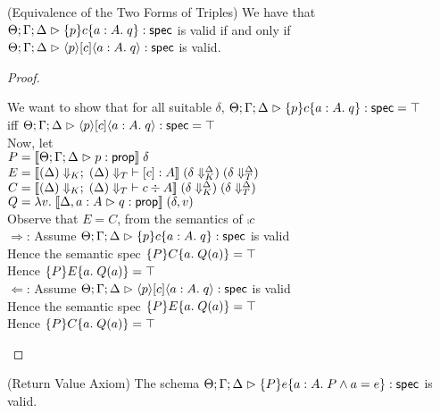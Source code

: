 \begin{lemma}{(Equivalence of the Two Forms of Triples)}
We have that $\judgeS{\spec{p}{c}{a:A}{q}}$ is valid if and only if $\judgeS{\mspec{p}{\comp{c}}{a:A}{q}}$ is valid.
\end{lemma}

\begin{proof}
\begin{tabbedproof}
\oo We want to show that for all suitable $\delta$, $\judgeS{\spec{p}{c}{a:A}{q}} = \top$  \\
\ox iff $\judgeS{\mspec{p}{\comp{c}}{a:A}{q}} = \top$  \\
\oo Now, let \\
\oox $P = \interp{\judgeA{p}{\assert}}\;\delta$ \\
\oox $E = \interp{\judgeE[\restrictkind{\Delta}]{\restricttype{\Delta}}
                  {[c]}{A}} \;(\restricttyenv{\Delta}{\delta})
                            \;(\restrictvals{\Delta}{\delta})$ \\
\oox $C = \interp{\judgeC[\restrictkind{\Delta}]{\restricttype{\Delta}}
                  {c}{A}} \;(\restricttyenv{\Delta}{\delta})
                          \;(\restrictvals{\Delta}{\delta})$ \\
\oox $Q = \semfun{v}{\interp{\judgeA[\Delta, a:A]{q}{\assert}}\;(\delta,v)}$ \\
\oo Observe that $E = C$, from the semantics of $\comp{c}$ \\
\oo $\Rightarrow$: Assume $\judgeS{\spec{p}{c}{a:A}{q}}$ is valid \\
\ooo Hence the semantic spec $\spec{P}{C}{a}{Q(a)} = \top$ \\
\ooo Hence $\spec{P}{E}{a}{Q(a)} = \top$ \\
\oo $\Leftarrow$: Assume $\judgeS{\mspec{p}{\comp{c}}{a:A}{q}}$ is valid \\
\ooo Hence the semantic spec $\spec{P}{E}{a}{Q(a)} = \top$ \\
\ooo Hence $\spec{P}{C}{a}{Q(a)} = \top$
\end{tabbedproof}
\end{proof}


\begin{lemma}{(Return Value Axiom)}
The schema $\judgeS{\spec{P}{e}{a:A}{P \land a = e}}$ is valid.
\end{lemma}

